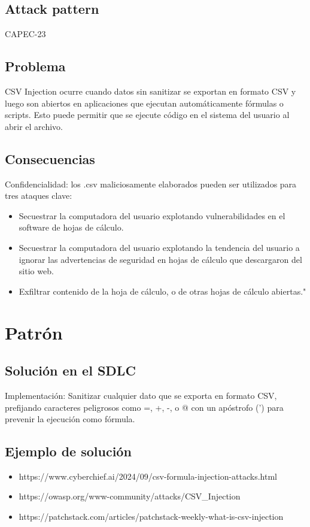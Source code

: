\subsection{Attack pattern}
CAPEC-23
\subsection{Problema}
CSV Injection ocurre cuando datos sin sanitizar se exportan en formato CSV y luego son abiertos en aplicaciones que ejecutan automáticamente fórmulas o scripts. Esto puede permitir que se ejecute código en el sistema del usuario al abrir el archivo.
\subsection{Consecuencias}
Confidencialidad: los .csv maliciosamente elaborados pueden ser utilizados para tres ataques clave:
\begin{itemize}
    \item Secuestrar la computadora del usuario explotando vulnerabilidades en el software de hojas de cálculo.
    \item Secuestrar la computadora del usuario explotando la tendencia del usuario a ignorar las advertencias de seguridad en hojas de cálculo que descargaron del sitio web.
    \item Exfiltrar contenido de la hoja de cálculo, o de otras hojas de cálculo abiertas."
\end{itemize}


\section{Patrón}
\subsection{Solución en el SDLC}
Implementación: Sanitizar cualquier dato que se exporta en formato CSV, prefijando caracteres peligrosos como =, +, -, o @ con un apóstrofo (') para prevenir la ejecución como fórmula.
\subsection{Ejemplo de solución}
\begin{itemize}
    \item https://www.cyberchief.ai/2024/09/csv-formula-injection-attacks.html
    \item https://owasp.org/www-community/attacks/CSV\_Injection
    \item https://patchstack.com/articles/patchstack-weekly-what-is-csv-injection
\end{itemize}
